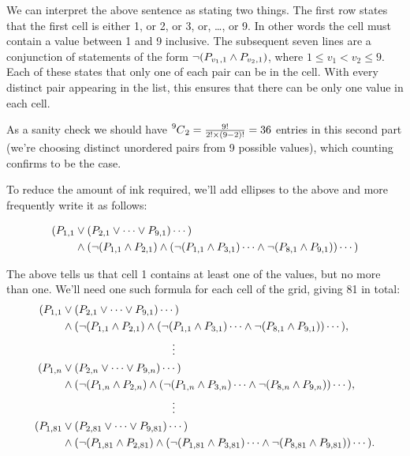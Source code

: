 \documentclass[10pt]{article}
\begin{document}
We can interpret the above sentence as stating two things. The first row states that the first cell is either 1, or 2, or 3, or, \ldots, or 9. In other words the cell must contain a value between 1 and 9 inclusive. The subsequent seven lines are a conjunction of statements of the form $\lnot (\PV{v_1, 1} \land \PV{v_2, 1})$, where $1 \le v_1 < v_2 \le 9$. Each of these states that only one of each pair can be in the cell. With every distinct pair appearing in the list, this ensures that there can be only one value in each cell.

As a sanity check we should have $\combination[9]{2} = \frac{9!}{2! \times (9 - 2)!} = 36$ entries in this second part (we're choosing distinct unordered pairs from 9 possible values), which counting confirms to be the case.

To reduce the amount of ink required, we'll add ellipses to the above and more frequently write it as follows:

\begin{align*}
(\PV{1, 1} & \lor (\PV{2, 1} \lor \cdots \lor \PV{9, 1}) \cdots ) \\
& \land (\lnot(\PV{1, 1} \land \PV{2, 1}) \land (\lnot(\PV{1, 1} \land \PV{3, 1}) \cdots \land \lnot(\PV{8, 1} \land \PV{9, 1})) \cdots )
\end{align*}

The above tells us that cell 1 contains at least one of the values, but no more than one. We'll need one such formula for each cell of the grid, giving 81 in total:
\begin{align*}
(\PV{1, 1} & \lor (\PV{2, 1} \lor \cdots \lor \PV{9, 1}) \cdots ) \\
& \land (\lnot(\PV{1, 1} \land \PV{2, 1}) \land (\lnot(\PV{1, 1} \land \PV{3, 1}) \cdots \land \lnot(\PV{8, 1} \land \PV{9, 1})) \cdots ) , \\
& \qquad \qquad \qquad \qquad \qquad \vdots \\
(\PV{1, n} & \lor (\PV{2, n} \lor \cdots \lor \PV{9, n}) \cdots ) \\
& \land (\lnot(\PV{1, n} \land \PV{2, n}) \land (\lnot(\PV{1, n} \land \PV{3, n}) \cdots \land \lnot(\PV{8, n} \land \PV{9, n})) \cdots ) , \\
& \qquad \qquad \qquad \qquad \qquad \vdots \\
(\PV{1, 81} & \lor (\PV{2, 81} \lor \cdots \lor \PV{9, 81}) \cdots ) \\
& \land (\lnot(\PV{1, 81} \land \PV{2, 81}) \land (\lnot(\PV{1, 81} \land \PV{3, 81}) \cdots \land \lnot(\PV{8, 81} \land \PV{9, 81})) \cdots ) .
\end{align*}
\end{document}
